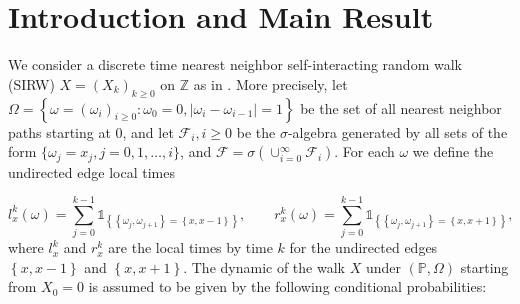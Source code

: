 \documentclass[EJP]{ejpecp} %
\begin{document}


\section{Introduction and Main Result}



We consider a discrete time nearest neighbor self-interacting random walk (SIRW) $X = (X_k)_{k\geq 0}$ on $\mathbb{Z}$ as in \cite{T96,KMP23}. More precisely, let $\Omega = \left\{\omega = (\omega_i)_{i \geq 0}: \omega_0 = 0, |\omega_i - \omega_{i - 1}| = 1 \right\}$ be the set of all nearest neighbor paths starting at 0, and let $\mathcal{F}_i, i \ge 0$ be the $\sigma$-algebra generated by all sets of the form $\{\omega_j = x_j, j = 0, 1, \ldots, i\} $, and $\mathcal{F} = \sigma\left( \cup_{i = 0}^\infty   \mathcal{F}_i\right)$. For each $\omega$ we define the undirected edge local times

\[ 
l_x^k(\omega) = \sum_{j=0}^{k-1} \mathbb{1}_{ \left\{  \left\{\omega_j, \omega_{j+1}\right\} =  \left\{x,x-1\right\} \right\} }, \qquad
r_x^k(\omega) = \sum_{j=0}^{k-1} \mathbb{1}_{ \left\{  \left\{\omega_j, \omega_{j+1}\right\} =  \left\{x,x+1\right\} \right\} }   
,\]
where $l_x^k$ and $r_x^k$ are the local times by time $k$ for the undirected edges $\left\{x,x-1\right\}$ and $\left\{x,x+1\right\}$.
The dynamic of the walk $X$ under $(\mathbb{P}, \Omega)$ starting from $X_0 = 0$ is assumed to be given by the following conditional probabilities:
\end{document}
